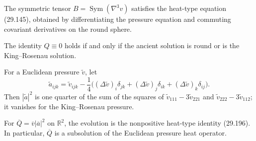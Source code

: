 \begin{lemma}
\label{lem:chow-iv-symmetrized-third-derivative-evolution}
The symmetric tensor \(B=\operatorname{Sym}(\nabla^3v)\) satisfies the
heat-type equation (29.145), obtained by differentiating the pressure
equation and commuting covariant derivatives on the round sphere.
\end{lemma}

\begin{proposition}
\label{prop:chow-iv-q-zero-characterizes-king-rosenau}
The identity \(Q\equiv0\) holds if and only if the ancient solution is round
or is the King--Rosenau solution.
\end{proposition}

\begin{example}
\label{ex:chow-iv-euclidean-q-expressions}
For a Euclidean pressure \(\widetilde v\), let
\[
 \widetilde a_{ijk}=\widetilde v_{ijk}-\frac14
 \bigl((\Delta\widetilde v)_i\delta_{jk}
 +(\Delta\widetilde v)_j\delta_{ik}
 +(\Delta\widetilde v)_k\delta_{ij}\bigr).
\]
Then \(|\widetilde a|^2\) is one quarter of the sum of the squares of
\(\widetilde v_{111}-3\widetilde v_{221}\) and
\(\widetilde v_{222}-3\widetilde v_{112}\); it vanishes for the
King--Rosenau pressure.
\end{example}

\begin{lemma}
\label{lem:chow-iv-euclidean-q-evolution}
For \(\overline Q=\overline v|\overline a|^2\) on \(\mathbb R^2\), the
evolution is the nonpositive heat-type identity (29.196).  In particular,
\(\overline Q\) is a subsolution of the Euclidean pressure heat operator.
\end{lemma}

